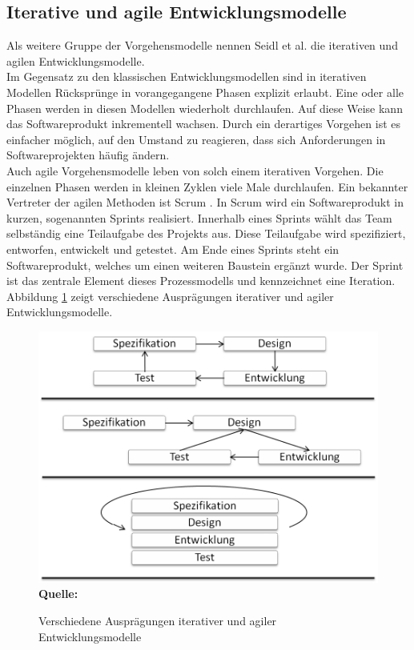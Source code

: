 \subsection{Iterative und agile Entwicklungsmodelle}
\label{subsec:iterative_und_agile_entwicklungsmodelle}
Als weitere Gruppe der Vorgehensmodelle nennen Seidl et al. \cite[vgl. S.23 ff.]{seidl_basiswissen_2012} die iterativen und agilen Entwicklungsmodelle.\\
Im Gegensatz zu den klassischen Entwicklungsmodellen sind in iterativen Modellen Rücksprünge in vorangegangene Phasen explizit erlaubt. Eine oder alle Phasen werden in diesen Modellen wiederholt durchlaufen. Auf diese Weise kann das Softwareprodukt inkrementell wachsen. Durch ein derartiges Vorgehen ist es einfacher möglich, auf den Umstand zu reagieren, dass sich Anforderungen in Softwareprojekten häufig ändern. \\
Auch agile Vorgehensmodelle leben von solch einem iterativen Vorgehen. Die einzelnen Phasen werden in kleinen Zyklen viele Male durchlaufen.
Ein bekannter Vertreter der agilen Methoden ist Scrum \cite{schwaber_agile_2002}. In Scrum wird ein Softwareprodukt in kurzen, sogenannten Sprints realisiert. Innerhalb eines Sprints wählt das Team selbständig eine Teilaufgabe des Projekts aus. Diese Teilaufgabe wird spezifiziert, entworfen, entwickelt und getestet. Am Ende eines Sprints steht ein Softwareprodukt, welches um einen weiteren Baustein ergänzt wurde.
Der Sprint ist das zentrale Element dieses Prozessmodells und kennzeichnet eine Iteration.
Abbildung \ref{fig:verschiedene_auspraegungen_iterativer_und_agiler_entwicklungsmodelle} zeigt verschiedene Ausprägungen iterativer und agiler Entwicklungsmodelle.\\
\begin{figure}[htb]
  \centering  
  \includegraphics[scale=0.8]{img/iterativeentwicklungsmodelle.png}\\
  \footnotesize\sffamily\textbf{Quelle:} \cite[vgl. S.24]{seidl_basiswissen_2012}
  \caption{Verschiedene Ausprägungen iterativer und agiler Entwicklungsmodelle}
  \label{fig:verschiedene_auspraegungen_iterativer_und_agiler_entwicklungsmodelle}
\end{figure}
